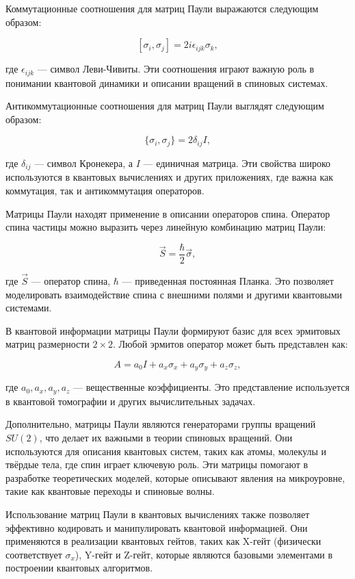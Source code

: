 \documentclass[a4paper]{report}
\begin{document}
Коммутационные соотношения для матриц Паули выражаются следующим образом:

$$
[\sigma_i, \sigma_j] = 2i\epsilon_{ijk}\sigma_k,
$$

где $\epsilon_{ijk}$ — символ Леви-Чивиты. Эти соотношения играют важную роль в понимании квантовой динамики и описании вращений в спиновых системах.

Антикоммутационные соотношения для матриц Паули выглядят следующим образом:

$$
\{\sigma_i, \sigma_j\} = 2\delta_{ij}I,
$$

где $\delta_{ij}$ — символ Кронекера, а $I$ — единичная матрица. Эти свойства широко используются в квантовых вычислениях и других приложениях, где важна как коммутация, так и антикоммутация операторов.

Матрицы Паули находят применение в описании операторов спина. Оператор спина частицы можно выразить через линейную комбинацию матриц Паули:

$$
\vec{S} = \frac{\hbar}{2} \vec{\sigma},
$$

где $\vec{S}$ — оператор спина, $\hbar$ — приведенная постоянная Планка. Это позволяет моделировать взаимодействие спина с внешними полями и другими квантовыми системами.

В квантовой информации матрицы Паули формируют базис для всех эрмитовых матриц размерности $2 \times 2$. Любой эрмитов оператор может быть представлен как:

$$
A = a_0 I + a_x \sigma_x + a_y \sigma_y + a_z \sigma_z,
$$

где $a_0, a_x, a_y, a_z$ — вещественные коэффициенты. Это представление используется в квантовой томографии и других вычислительных задачах.

Дополнительно, матрицы Паули являются генераторами группы вращений $SU(2)$, что делает их важными в теории спиновых вращений. Они используются для описания квантовых систем, таких как атомы, молекулы и твёрдые тела, где спин играет ключевую роль. Эти матрицы помогают в разработке теоретических моделей, которые описывают явления на микроуровне, такие как квантовые переходы и спиновые волны.

Использование матриц Паули в квантовых вычислениях также позволяет эффективно кодировать и манипулировать квантовой информацией. Они применяются в реализации квантовых гейтов, таких как X-гейт (физически соответствует $\sigma_x$), Y-гейт и Z-гейт, которые являются базовыми элементами в построении квантовых алгоритмов.
\end{document}

